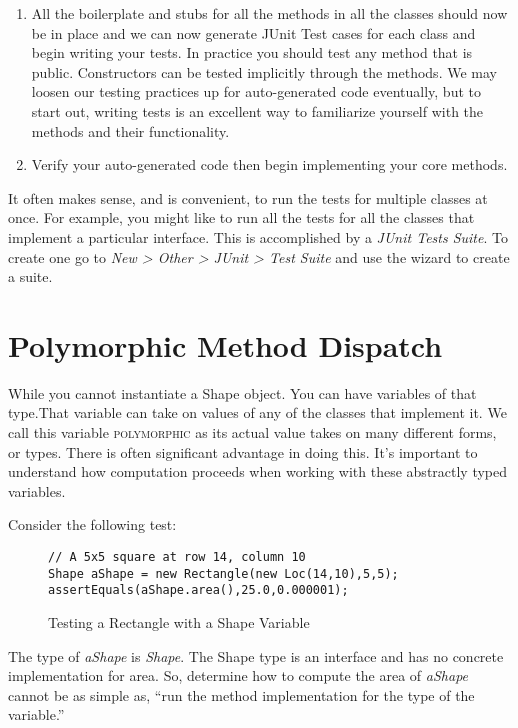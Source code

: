 \documentclass[]{tufte-handout}
\begin{document}
\begin{enumerate}
\item All the boilerplate and stubs for all the methods in all the classes should now be in place and we can now generate JUnit Test cases for each class and begin writing your tests. \newline
In practice you should test any method that is public. Constructors can be tested implicitly through the methods. We may loosen our testing practices up for auto-generated code eventually, but to start out, writing tests is an excellent way to familiarize yourself with the methods and their functionality. 

\item Verify your auto-generated code then begin implementing your core methods. 
\end{enumerate}

It often makes sense, and is convenient, to run the tests for multiple classes at once. For example, you might like to run all the tests for all the classes that implement a particular interface. This is accomplished by a \textit{JUnit Tests Suite}. To create one go to \textit{New > Other > JUnit > Test Suite} and use the wizard to create a suite. 

\section{Polymorphic Method Dispatch}

While you cannot instantiate a Shape object. You can have variables of that type.That variable can take on values of any of the classes that implement it. We call this variable \textsc{polymorphic} as its actual value takes on many different forms, or types. There is often significant advantage in doing this. It's important to understand how computation proceeds when working with these abstractly typed variables. 

Consider the following test:
\begin{figure}
\begin{lstlisting}
// A 5x5 square at row 14, column 10
Shape aShape = new Rectangle(new Loc(14,10),5,5);
assertEquals(aShape.area(),25.0,0.000001);
\end{lstlisting}
\caption{Testing a Rectangle with a Shape Variable}
\end{figure}
The type of \textit{aShape} is \textit{Shape}. The Shape type is an interface and has no concrete implementation for area. So, determine how to compute the area of \textit{aShape} cannot be as simple as, ``run the method implementation for the type of the variable.''  
\end{document}
